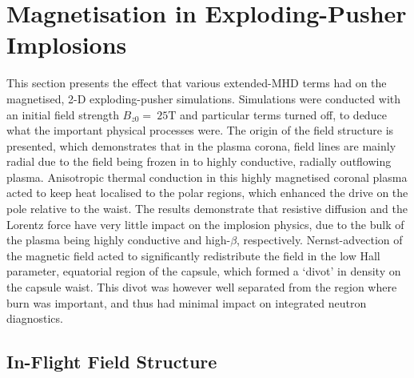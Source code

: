 \section{Magnetisation in Exploding-Pusher Implosions}%
\label{sec:Res2_mag_unmag}

This section presents the effect that various extended-\ac{MHD} terms had on the magnetised, 2-D exploding-pusher simulations.
Simulations were conducted with an initial field strength $B_{z0}=\ 25\text{T}$ and particular terms turned off, to deduce what the important physical processes were.
The origin of the field structure is presented, which demonstrates that in the plasma corona, field lines are mainly radial due to the field being frozen in to highly conductive, radially outflowing plasma.
Anisotropic thermal conduction in this highly magnetised coronal plasma acted to keep heat localised to the polar regions, which enhanced the drive on the pole relative to the waist.
The results demonstrate that resistive diffusion and the Lorentz force have very little impact on the implosion physics, due to the bulk of the plasma being highly conductive and high-$\beta$, respectively.
Nernst-advection of the magnetic field acted to significantly redistribute the field in the low Hall parameter, equatorial region of the capsule, which formed a `divot' in density on the capsule waist.
This divot was however well separated from the region where burn was important, and thus had minimal impact on integrated neutron diagnostics.

\subsection{In-Flight Field Structure}%
\label{sec:Res2_field_structure}

